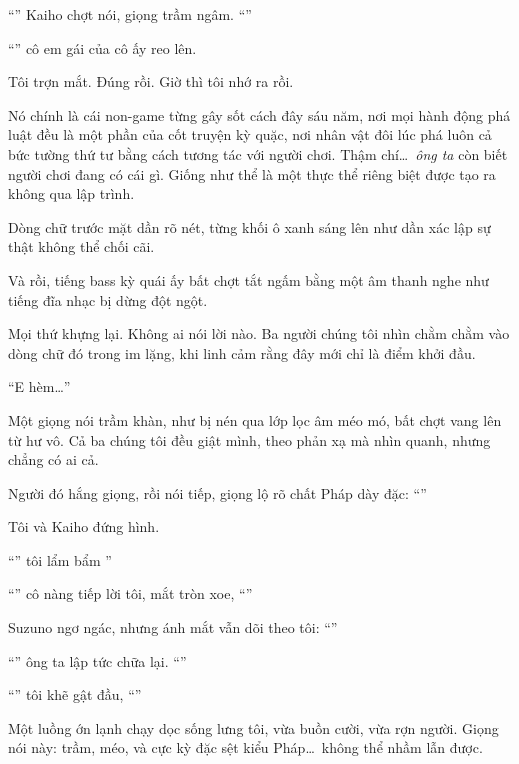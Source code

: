\documentclass[../main.tex]{subfiles}
\begin{document}
``'' Kaiho chợt nói, giọng trầm ngâm. ``''

``'' cô em gái của cô ấy reo lên.

Tôi trợn mắt. Đúng rồi. Giờ thì tôi nhớ ra rồi.

Nó chính là cái non-game từng gây sốt cách đây sáu năm, nơi mọi hành động phá luật đều là một phần của cốt truyện kỳ quặc, nơi nhân vật đôi lúc phá luôn cả bức tường thứ tư bằng cách tương tác với người chơi. Thậm chí\dots\ \emph{ông ta} còn biết người chơi đang có cái gì. Giống như thể là một thực thể riêng biệt được tạo ra không qua lập trình.

Dòng chữ trước mặt dần rõ nét, từng khối ô xanh sáng lên như dần xác lập sự thật không thể chối cãi.

Và rồi, tiếng bass kỳ quái ấy bất chợt tắt ngấm bằng một âm thanh nghe như tiếng đĩa nhạc bị dừng đột ngột.

Mọi thứ khựng lại. Không ai nói lời nào. Ba người chúng tôi nhìn chằm chằm vào dòng chữ đó trong im lặng, khi linh cảm rằng đây mới chỉ là điểm khởi đầu.

``E hèm\dots''

Một giọng nói trầm khàn, như bị nén qua lớp lọc âm méo mó, bất chợt vang lên từ hư vô. Cả ba chúng tôi đều giật mình, theo phản xạ mà nhìn quanh, nhưng chẳng có ai cả.

Người đó hắng giọng, rồi nói tiếp, giọng lộ rõ chất Pháp dày đặc: ``''

Tôi và Kaiho đứng hình.

``'' tôi lẩm bẩm ''

``'' cô nàng tiếp lời tôi, mắt tròn xoe, ``''

Suzuno ngơ ngác, nhưng ánh mắt vẫn dõi theo tôi: ``''

``'' ông ta lập tức chữa lại. ``''

``'' tôi khẽ gật đầu, ``''

Một luồng ớn lạnh chạy dọc sống lưng tôi, vừa buồn cười, vừa rợn người. Giọng nói này: trầm, méo, và cực kỳ đặc sệt kiểu Pháp\dots\ không thể nhầm lẫn được.
\end{document}
